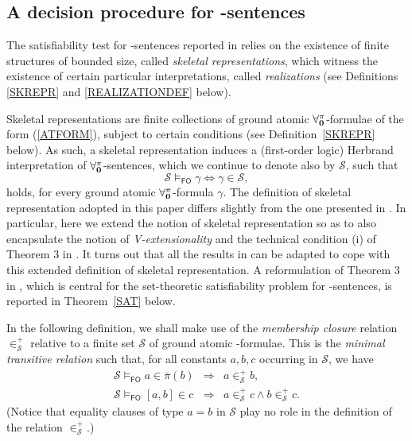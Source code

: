 \documentclass[a4paper]{llncs}
\newcommand{\memclosure}[1]{\in_{#1}^{+}}
\newcommand{\pairin}[3]{\left[#1,#2\right] \in #3}
\newcommand{\nonpairin}[2]{#1 \in \bar{\pi}(#2)}
\newcommand{\atset}{\mathcal{S}}
\newcommand{\consta}{a}
\newcommand{\constb}{b}
\newcommand{\constc}{c}
\newcommand{\fomodels}[2]{#1 \models_{\mathsf{FO}} #2}
\begin{document}
\subsection{A decision procedure for \Forallpizero-sentences}\label{DECPROC}

The satisfiability test for \Forallpizero-sentences reported in
\cite{CanLonNic2011} relies on the existence of finite structures of
bounded size, called \emph{skeletal representations}, which witness
the existence of certain particular interpretations, called \emph{realizations}
(see Definitions \ref{SKREPR} and \ref{REALIZATIONDEF} below).


Skeletal representations are finite collections of ground atomic
$\mathbf{\forall_{0}^{\pi}}$-formulae of the form (\ref{ATFORM}), subject to 
certain conditions (see Definition~\ref{SKREPR} below). As such, a 
skeletal representation induces a (first-order logic) Herbrand 
interpretation of $\mathbf{\forall_{0}^{\pi}}$-sentences, which we continue to 
denote also by $\atset$, such that
\[
  \fomodels{\atset}{\gamma} \iff \gamma \in \atset ,
\]
holds, for every ground atomic $\mathbf{\forall_{0}^{\pi}}$-formula $\gamma$.
The definition of skeletal representation adopted in this paper
differs slightly from the one presented in \cite{CanLonNic2011}.  In
particular, here we extend the notion of skeletal representation so as
to also encapsulate the notion of \emph{V-extensionality} and the
technical condition (i) of Theorem 3 in \cite{CanLonNic2011}.
It turns out that all the results in \cite{CanLonNic2011}
can be adapted to cope with this extended definition of skeletal
representation.
A reformulation of Theorem 3 in \cite{CanLonNic2011}, which is central
for the set-theoretic satisfiability problem for \Forallpizero-sentences,
is reported in Theorem~\ref{SAT} below.

In the following definition, we shall make use of the \emph{membership
closure} relation $\memclosure{\atset}$ relative to a finite set 
$\atset$ of ground atomic \Forallpizero-formulae. This is the 
\emph{minimal transitive relation} such that, for all constants 
$\consta, \constb, \constc$
occurring in $\atset$, we have
\[
  \begin{array}{rcl}
   \fomodels{\atset}{\nonpairin{\consta}{\constb}} & \Longrightarrow & 
\consta \memclosure{\atset} \constb ,\\
   \fomodels{\atset}{\pairin{\consta}{\constb}{\constc}} & 
\Longrightarrow & \consta \memclosure{\atset} \constc \wedge \constb 
\memclosure{\atset} \constc .
  \end{array}
\]
(Notice that equality clauses of type $a = b$ in $\atset$ play no 
role in the definition of the relation $\memclosure{\atset}$.)
\end{document}
